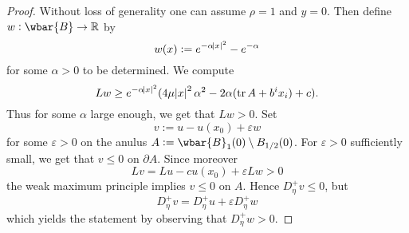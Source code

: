 \begin{proof}
	Without loss of generality one can assume $\rho = 1$ and $y = 0$. Then define $w : \wbar{B} \to \mathbb{R}$ by
	\begin{equation*}
		w(x) := e^{-\alpha \abs{x}^2} - e^{-\alpha}
	\end{equation*}
	\noindent for some $\alpha > 0$ to be determined. We compute
	\begin{equation*}
		Lw \geq e^{-\alpha\abs{x}^2}(4\mu \abs{x}^2\alpha^2 -2 \alpha (\operatorname{tr} A + b^i x_i) + c).
	\end{equation*}
	Thus for some $\alpha$ large enough, we get that $Lw > 0$. Set 
	\begin{equation*}
		v := u - u(x_0) + \varepsilon w
	\end{equation*}
	\noindent for some $\varepsilon > 0$ on the anulus $A := \wbar{B}_1(0) \setminus B_{1/2}(0)$. For $\varepsilon > 0$ sufficiently small, we get that $v \leq 0$ on $\partial A$. Since moreover
	\begin{equation*}
		Lv = Lu - cu(x_0) + \varepsilon Lw > 0
	\end{equation*}
	\noindent the weak maximum principle implies $v \leq 0$ on $A$. Hence $D^+_\eta v \leq 0$, but 
	\begin{equation*}
		D^+_\eta v = D^+_\eta u + \varepsilon D^+_\eta w
	\end{equation*}
	\noindent which yields the statement by observing that $D^+_\eta w > 0$.
\end{proof}


